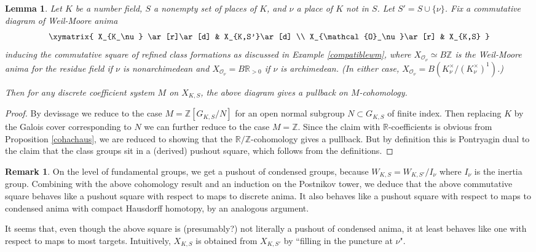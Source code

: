 \documentclass[12pt]{article}
\newtheorem{lemma}[theorem]{Lemma}
\theoremstyle{definition}
\newtheorem{remark}[theorem]{Remark}
\newcommand{\mc}{\mathcal}
\newcommand{\mbb}{\mathbb}
\begin{document}
\begin{lemma}\label{fillinpuncture}
Let $K$ be a number field, $S$ a nonempty set of places of $K$, and $\nu$ a place of $K$ not in $S$.  Let $S'=S\cup\{\nu\}$.  Fix a commutative diagram of Weil-Moore anima
$$\xymatrix{
X_{K_\nu} \ar[r]\ar[d] & X_{K,S'}\ar[d] \\
X_{\mc{O}_\nu}\ar[r] & X_{K,S}
}$$
inducing the commutative square of refined class formations as discussed in Example \ref{compatiblewm}, where $X_{\mc{O}_\nu}\simeq B\mbb{Z}$ is the Weil-Moore anima for the residue field if $\nu$ is nonarchimedean and $X_{\mc{O}_\nu} = B\mbb{R}_{>0}$ if $\nu$ is archimedean.  (In either case, $X_{\mc{O}_\nu}=B(K_\nu^\times/(K_\nu^\times)^1)$.)

Then for any discrete coefficient system $M$ on $X_{K,S}$, the above diagram gives a pullback on $M$-cohomology.
\end{lemma}
\begin{proof}
By devissage we reduce to the case $M=\mbb{Z}[G_{K,S}/N]$ for an open normal subgroup $N\subset G_{K,S}$ of finite index.  Then replacing $K$ by the Galois cover corresponding to $N$ we can further reduce to the case $M=\mbb{Z}$.  Since the claim with $\mbb{R}$-coefficients is obvious from Proposition \ref{cohachaus}, we are reduced to showing that the $\mbb{R}/\mbb{Z}$-cohomology gives a pullback.  But by definition this is Pontryagin dual to the claim that the class groups sit in a (derived) pushout square, which follows from the definitions.
\end{proof}


\begin{remark}
On the level of fundamental groups, we get a pushout of condensed groups, because $W_{K,S} = W_{K,S'}/I_\nu$ where $I_\nu$ is the inertia group.  Combining with the above cohomology result and an induction on the Postnikov tower, we deduce that the above commutative square behaves like a pushout square with respect to maps to discrete anima.  It also behaves like a pushout square with respect to maps to condensed anima with compact Hausdorff homotopy, by an analogous argument.

It seems that, even though the above square is (presumably?) not literally a pushout of condensed anima, it at least behaves like one with respect to maps to most targets.  Intuitively, $X_{K,S}$ is obtained from $X_{K,S'}$ by ``filling in the puncture at $\nu$".
\end{remark}
\end{document}
